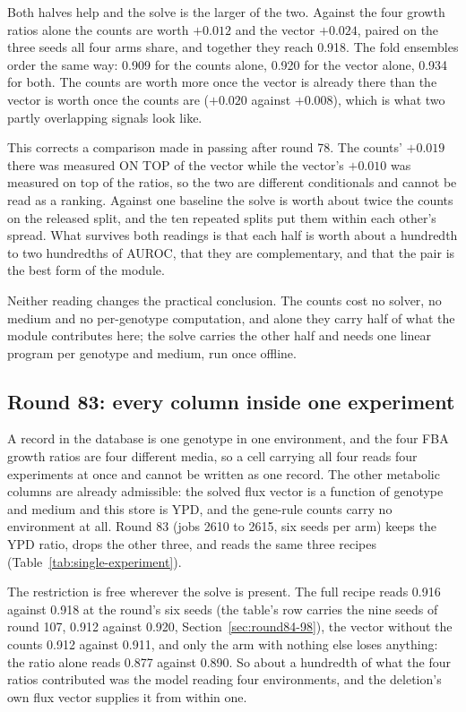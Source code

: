 Both halves help and the solve is the larger of the two. Against the four growth ratios
alone the counts are worth $+0.012$ and the vector $+0.024$, paired on the three seeds all
four arms share, and together they reach 0.918. The fold ensembles order the same way:
0.909 for the counts alone, 0.920 for the vector alone, 0.934 for both. The counts are
worth more once the vector is already there than the vector is worth once the counts are
($+0.020$ against $+0.008$), which is what two partly overlapping signals look like.

This corrects a comparison made in passing after round 78. The counts' $+0.019$ there was
measured ON TOP of the vector while the vector's $+0.010$ was measured on top of the
ratios, so the two are different conditionals and cannot be read as a ranking. Against
one baseline the solve is worth about twice the counts on the released split, and the ten
repeated splits put them within each other's spread. What survives both readings is that
each half is worth about a hundredth to two hundredths of AUROC, that they are
complementary, and that the pair is the best form of the module.

Neither reading changes the practical conclusion. The counts cost no solver, no medium
and no per-genotype computation, and alone they carry half of what the module contributes
here; the solve carries the other half and needs one linear program per genotype and
medium, run once offline.



\subsection{Round 83: every column inside one experiment}
\label{sec:round83}

A record in the database is one genotype in one environment, and the four FBA growth
ratios are four different media, so a cell carrying all four reads four experiments at
once and cannot be written as one record. The other metabolic columns are already
admissible: the solved flux vector is a function of genotype and medium and this store is
YPD, and the gene-rule counts carry no environment at all. Round 83 (jobs 2610 to 2615,
six seeds per arm) keeps the YPD ratio, drops the other three, and reads the same three
recipes (Table~\ref{tab:single-experiment}).

The restriction is free wherever the solve is present. The full recipe reads 0.916 against
0.918 at the round's six seeds (the table's row carries the nine seeds of round 107,
0.912 against 0.920, Section~\ref{sec:round84-98}), the vector without the counts 0.912 against 0.911, and only the arm with nothing
else loses anything: the ratio alone reads 0.877 against 0.890. So about a hundredth of
what the four ratios contributed was the model reading four environments, and the deletion's
own flux vector supplies it from within one.


